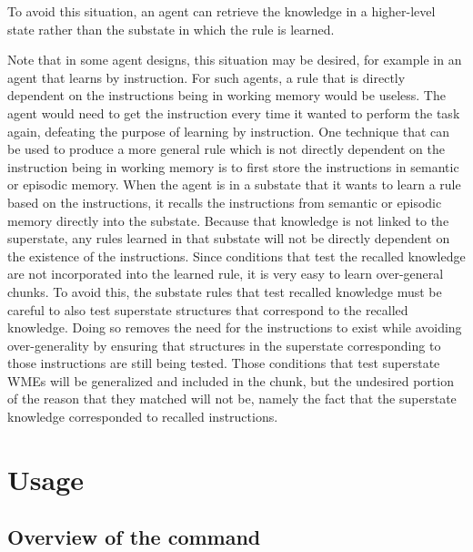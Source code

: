\begin{enumerate}
	To avoid this situation, an agent can retrieve the knowledge in a higher-level state rather than the substate in which the rule is learned.

	Note that in some agent designs, this situation may be desired, for example in an agent that learns by instruction.   For such agents, a rule that is directly dependent on the instructions being in working memory would be useless.  The agent would need to get the instruction every time it wanted to perform the task again, defeating the purpose of learning by instruction.  One technique that can be used to produce a more general rule which is not directly dependent on the instruction being in working memory is to first store the instructions in semantic or episodic memory.  When the agent is in a substate that it wants to learn a rule based on the instructions, it recalls the instructions from semantic or episodic memory directly into the substate.  Because that knowledge is not linked to the superstate, any rules learned in that substate will not be directly dependent on the existence of the instructions.  Since conditions that test the recalled knowledge are not incorporated into the learned rule, it is very easy to learn over-general chunks.  To avoid this, the substate rules that test recalled knowledge must be careful to also test superstate structures that correspond to the recalled knowledge.  Doing so removes the need for the instructions to exist while avoiding over-generality by ensuring that structures in the superstate corresponding to those instructions are still being tested.  Those conditions that test superstate WMEs will be generalized and included in the chunk, but the undesired portion of the reason that they matched will not be, namely the fact that the superstate knowledge corresponded to recalled instructions.


\end{enumerate}


\section{Usage}
\label{CHUNKING-usage}

\subsection{Overview of the  command}

